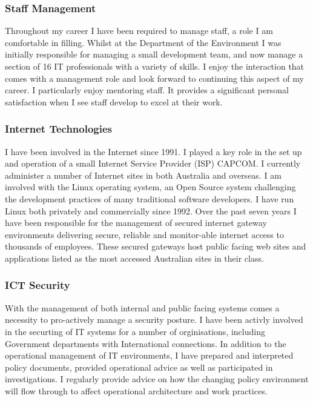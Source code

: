\documentclass[]{friggeri-cv} %
\begin{document}
\subsubsection*{Staff Management}
Throughout my career I have been required to manage staff, a role I am comfortable in filling. Whilst at the Department of the Environment I was initially responsible for managing a small development team, and now manage a section of 16 IT professionals with a variety of skills.  I enjoy the interaction that comes with a management role and look forward to continuing this aspect of my career.  I particularly enjoy mentoring staff. It provides a significant personal satisfaction when I see staff develop to excel at their work.

\subsubsection*{Internet Technologies}
I have been involved in the Internet since 1991. I played a key role in the set up and operation of a small Internet Service Provider (ISP) CAPCOM. I currently administer a number of Internet sites in both Australia and overseas. I am involved with the Linux operating system, an Open Source system challenging the development practices of many traditional software developers. I have run Linux both privately and commercially since 1992. Over the past seven years I have been responsible for the management of secured internet gateway environments delivering secure, reliable and monitor-able internet access to thousands of employees. These secured gateways host public facing web sites and applications listed as the most accessed Australian sites in their class.

\subsubsection*{ICT Security}
With the management of both internal and public facing systems comes a necessity to pro-actively manage a security posture. I have been activly involved in the securting of IT systems for a number of orginisations, including Government departments with International connections. In addition to the operational management of IT environments, I have prepared and interpreted policy documents, provided operational advice as well as participated in investigations. I regularly provide advice on how the changing policy environment will flow through to affect operational architecture and work practices.
\end{document}
